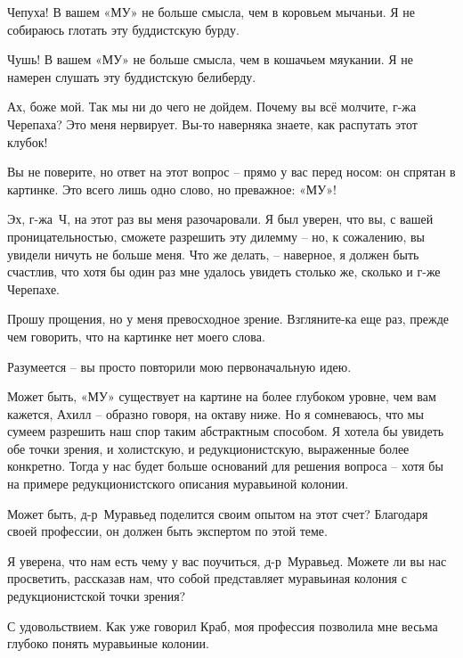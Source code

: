 \documentclass[../main.tex]{subfiles}
\begin{document}
\begin{dialogue}
 Чепуха! В вашем «МУ» не больше смысла, чем в коровьем мычаньи. Я не собираюсь глотать эту буддистскую бурду.

 Чушь! В вашем «МУ» не больше смысла, чем в кошачьем мяукании. Я не намерен слушать эту буддистскую белиберду.

 Ах, боже мой. Так мы ни до чего не дойдем. Почему вы всё молчите, г-жа Черепаха? Это меня нервирует. Вы-то наверняка знаете, как распутать этот клубок!

 Вы не поверите, но ответ на этот вопрос \--- прямо у вас перед носом: он спрятан в картинке. Это всего лишь одно слово, но преважное: «МУ»!


 Эх, г-жа~Ч, на этот раз вы меня разочаровали. Я был уверен, что вы, с вашей проницательностью, сможете разрешить эту дилемму \--- но, к сожалению, вы увидели ничуть не больше меня. Что же делать, \--- наверное, я должен быть счастлив, что хотя бы один раз мне удалось увидеть столько же, сколько и г-же Черепахе.

 Прошу прощения, но у меня превосходное зрение. Взгляните-ка еще раз, прежде чем говорить, что на картинке нет моего слова.

 Разумеется \--- вы просто повторили мою первоначальную идею.

 Может быть, «МУ» существует на картине на более глубоком уровне, чем вам кажется, Ахилл \--- образно говоря, на октаву ниже. Но я сомневаюсь, что мы сумеем разрешить наш спор таким абстрактным способом. Я хотела бы увидеть обе точки зрения, и холистскую, и редукционистскую, выраженные более конкретно. Тогда у нас будет больше оснований для решения вопроса \--- хотя бы на примере редукционистского описания муравьиной колонии.

 Может быть, д-р~Муравьед поделится своим опытом на этот счет? Благодаря своей профессии, он должен быть экспертом по этой теме.

 Я уверена, что нам есть чему у вас поучиться, д-р~Муравьед. Можете ли вы нас просветить, рассказав нам, что собой представляет муравьиная колония с редукционистской точки зрения?

 С удовольствием. Как уже говорил Краб, моя профессия позволила мне весьма глубоко понять муравьиные колонии.


\end{dialogue}
\end{document}

